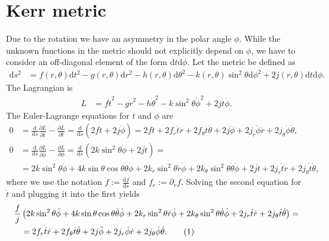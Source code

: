 \documentclass[english, parskip=full]{scrartcl}
\newcommand\numberthis{\addtocounter{equation}{1}\tag{\theequation}}
\newcommand{\kla}{}
\newcommand{\tecxt}{}
\begin{document}
\section{Kerr metric}
Due to the rotation we have an asymmetry in the polar angle $\phi$.
While the unknown functions in the metric should not explicitly depend on $\phi$, we have to consider an off-diagonal element of the form $\tecxt\text{d}t\tecxt\text{d}\phi$.
Let the metric be defined as
\begin{align}
\tecxt\text{d}s^2 &= f(r,\theta) \tecxt\text{d}t^2 - g(r,\theta) \tecxt\text{d}r^2 - h(r,\theta) \tecxt\text{d}\theta^2 - k (r,\theta) \sin^2\theta \tecxt\text{d}\phi^2 + 2j(r,\theta)\tecxt\text{d}t\tecxt\text{d}\phi.
\end{align}
The Lagrangian is
\begin{align}
L &= f\dot{t}^2 - g\dot{r}^2 - h\dot{\theta}^2 - k\sin^2\theta \dot{\phi}^2 + 2j\dot{t}\dot{\phi}.
\end{align}
The Euler-Lagrange equations for $t$ and $\phi$ are
\begin{align}
0 &= \frac{\tecxt\text{d}}{\tecxt\text{d}s} \frac{\partial L}{\partial \dot{t}} - \frac{\partial L}{\partial t} = \frac{\tecxt\text{d}}{\tecxt\text{d}s} \kla\left( 2f\dot{t} + 2j\dot{\phi} \right) = 2f \ddot{t} + 2f_r\dot{t}\dot{r} + 2f_\theta \dot{t}\dot{\theta} + 2j\ddot{\phi} + 2j_r\dot{\phi}\dot{r} + 2j_\theta \dot{\phi}\dot{\theta},\\
0 &= \frac{\tecxt\text{d}}{\tecxt\text{d}s} \frac{\partial L}{\partial \dot{\phi}} - \frac{\partial L}{\partial \phi} = \frac{\tecxt\text{d}}{\tecxt\text{d}s} \kla\left( 2k\sin^2\theta \dot{\phi} + 2j\dot{t} \right) = \\
&= 2k\sin^2\theta \ddot{\phi} + 4k\sin\theta\cos\theta \dot{\theta}\dot{\phi} + 2k_r\sin^2\theta \dot{r}\dot{\phi} + 2k_\theta \sin^2\theta \dot{\theta}\dot{\phi} + 2j\ddot{t} + 2j_r\dot{t}\dot{r} + 2j_\theta \dot{t}\dot{\theta},
\end{align}
where we use the notation $\dot{f} := \frac{\tecxt\text{d}f}{\tecxt\text{d}s}$ and $f_r := \partial_r f$.
Solving the second equation for $\ddot{t}$ and plugging it into the first yields
\begin{align*}
\frac{f}{j} &\kla\left( 2k\sin^2\theta \ddot{\phi} + 4k\sin\theta\cos\theta \dot{\theta}\dot{\phi} + 2k_r\sin^2\theta \dot{r}\dot{\phi} + 2k_\theta \sin^2\theta \dot{\theta}\dot{\phi} + 2j_r\dot{t}\dot{r} + 2j_\theta \dot{t}\dot{\theta} \right) = \\
&= 2f_r\dot{t}\dot{r} + 2f_\theta \dot{t}\dot{\theta} + 2j\ddot{\phi} + 2j_r\dot{\phi}\dot{r} + 2j_\theta \dot{\phi}\dot{\theta}. \numberthis
\end{align*}
\end{document}
